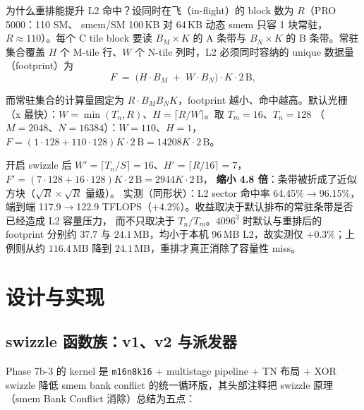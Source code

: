 为什么重排能提升 L2 命中？设同时在飞（in-flight）的 block 数为 $R$（PRO 5000：110 SM、
smem/SM 100\,KB 对 64\,KB 动态 smem 只容 1 块常驻，$R \approx 110$）。每个 C tile
block 要读 $B_M\times K$ 的 A 条带与 $B_N\times K$ 的 B 条带。常驻集合覆盖 $H$ 个
M-tile 行、$W$ 个 N-tile 列时，L2 必须同时容纳的 unique 数据量（footprint）为
\begin{equation}
  F \;=\; \bigl(H\!\cdot\!B_M \;+\; W\!\cdot\!B_N\bigr)\cdot K\cdot 2\,\mathrm{B},
  \label{eq:12-footprint}
\end{equation}

而常驻集合的计算量固定为 $R\cdot B_M B_N K$，footprint 越小、命中越高。默认光栅
（x 最快）：$W=\min(T_n,R)$、$H=\lceil R/W\rceil$。取 $T_m{=}16$、$T_n{=}128$
（$M{=}2048$、$N{=}16384$）：$W{=}110$、$H{=}1$，
$F=(1{\cdot}128+110{\cdot}128)K\cdot2\,\mathrm{B}=14208K\cdot2\,\mathrm{B}$。

开启 swizzle 后 $W'=\lceil T_n/S\rceil=16$、$H'=\lceil R/16\rceil=7$，
$F'=(7{\cdot}128+16{\cdot}128)K\cdot2\,\mathrm{B}=2944K\cdot2\,\mathrm{B}$，
\textbf{缩小 4.8 倍}：条带被折成了近似方块（$\sqrt{R}\times\sqrt{R}$ 量级）。
实测（同形状）：L2 sector 命中率 64.45\%$\to$96.15\%，端到端 117.9$\to$122.9
TFLOPS（+4.2\%）。收益取决于默认排布的常驻条带是否已经造成 L2 容量压力，
而不只取决于 $T_n/T_m$。$4096^3$ 时默认与重排后的 footprint 分别约
$37.7$ 与 $24.1$\,MB，均小于本机 96\,MB L2，故实测仅 $+0.3\%$；上例则从约
$116.4$\,MB 降到 $24.1$\,MB，重排才真正消除了容量性 miss。

\section{设计与实现}

\subsection{swizzle 函数族：v1、v2 与派发器}

Phase 7b-3 的 kernel 是 \texttt{m16n8k16} + multistage pipeline + TN
布局 + XOR swizzle 降低 smem bank conflict 的统一循环版，其头部注释把
swizzle 原理（smem Bank Conflict 消除）总结为五点：

